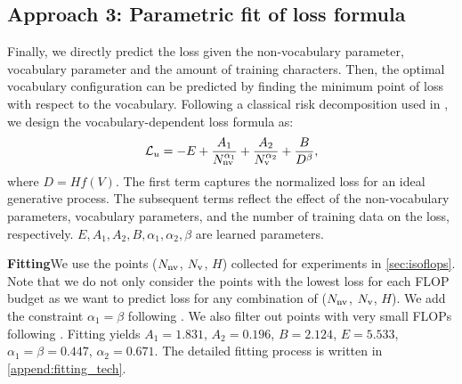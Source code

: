 \subsection{Approach 3: Parametric fit of loss formula}
\label{sec:parametric}
{Finally, we directly predict the loss given the non-vocabulary parameter, vocabulary parameter and the amount of training characters.} Then, the optimal vocabulary configuration can be predicted by finding the minimum point of loss with respect to the vocabulary. Following a classical risk decomposition used in \citet{hoffmann2022training}, we design the vocabulary-dependent loss formula as:
\begin{equation}
\label{eq:loss}
    \mathcal{L}_u = -E + \frac{A_1}{N_{\rm nv}^{\alpha_1}} +\frac{A_2}{N_{\rm v}^{\alpha_2}}+ \frac{B}{D^{\beta}},
\end{equation}
where $D=Hf(V)$.
The first term captures the normalized loss for an ideal generative process. The subsequent terms reflect the effect of the non-vocabulary parameters, vocabulary parameters, and the number of training data on the loss, respectively. $E, A_1, A_2, B, \alpha_1, \alpha_2, \beta$ are learned parameters.

\textbf{Fitting}\;\;\;\;We use the points ($N_{\rm nv}$, $N_{\rm v}$, $H$) collected for experiments in \autoref{sec:isoflops}. Note that we do not only consider the points with the lowest loss for each FLOP budget as we want to predict loss for any combination of ($N_{\rm nv}$, $N_{\rm v}$, $H$). We add the constraint $\alpha_1=\beta$ following \citet{muennighoff2024scaling}. We also filter out points with very small FLOPs following \citet{hoffmann2022training}. 
Fitting yields $A_1=1.831$, $A_2=0.196$, $B=2.124$, $E=5.533$, $\alpha_1=\beta=0.447$, $\alpha_2=0.671$. The detailed fitting process is written in \autoref{append:fitting_tech}.

